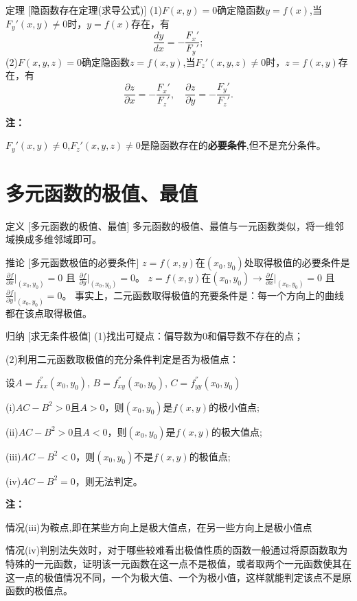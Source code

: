 \documentclass[a4paper,12pt,oneside,fontset=none]{ctexbook}
\newcounter{theorem}[chapter]
\newenvironment{theorem}[1][]{\begin{thmBox}{定理}{#1}}{\end{thmBox}}
\newenvironment{corollary}[1][]{\begin{thmBox}{推论}{#1}}{\end{thmBox}}
\newenvironment{induction}[1][]{\begin{thmBox}{归纳}{#1}}{\end{thmBox}}
\newcounter{definition}[chapter]
\newenvironment{definition}[1][]{\begin{defBox}{定义}{#1}}{\end{defBox}}
\newenvironment{note}{
    \par\vspace{0.5em}\noindent
    \textbf{\color{NoteColor} 注：}
}{
    \par\vspace{0.5em}
}
\numberwithin{equation}{chapter}
\begin{document}
\begin{theorem}
    [隐函数存在定理(求导公式)]
    (1)$F(x,y)=0$确定隐函数$y=f(x)$,当$F_y'(x,y)\neq 0$时，$y=f(x)$存在，有$$\frac{dy}{dx} = -\frac{F_x'}{F_y'};$$
    (2)$F(x,y,z)=0$确定隐函数$z=f(x,y)$,当$F_z'(x,y,z)\neq 0$时，$z=f(x,y)$存在，有$$\frac{\partial z}{\partial x} = -\frac{F_x'}{F_z'}, \quad \frac{\partial z}{\partial y} = -\frac{F_y'}{F_z'}.$$
\end{theorem}
\begin{note}
    $F_y'(x,y)\neq 0$,$F_z'(x,y,z)\neq 0$是隐函数存在的\textbf{必要条件},但不是充分条件。
\end{note}



\section{多元函数的极值、最值}
\begin{definition}
    [多元函数的极值、最值]
    多元函数的极值、最值与一元函数类似，将一维邻域换成多维邻域即可。
\end{definition}

\begin{corollary}
    [多元函数极值的必要条件]
    $z=f(x,y)$在$(x_0,y_0)$处取得极值的必要条件是 $\frac{\partial f}{\partial x}|_{(x_0,y_0)} = 0$ 且 $\frac{\partial f}{\partial y}|_{(x_0,y_0)} = 0$。
    $z=f(x,y)$在$(x_0,y_0) \rightarrow \frac{\partial f}{\partial x}|_{(x_0,y_0)} = 0$ 且 $\frac{\partial f}{\partial y}|_{(x_0,y_0)} = 0$。
    事实上，二元函数取得极值的充要条件是：每一个方向上的曲线都在该点取得极值。
\end{corollary}

\begin{induction}
    [求无条件极值]
    (1)找出可疑点：偏导数为0和偏导数不存在的点；
    
    (2)利用二元函数取极值的充分条件判定是否为极值点：

    设$A = f_{xx}^{''}(x_0,y_0)$, $B = f_{xy}^{''}(x_0,y_0)$, $C = f_{yy}^{''}(x_0,y_0)$

    (i)$AC - B^2 > 0$且$A > 0$，则$(x_0,y_0)$是$f(x,y)$的极小值点;

    (ii)$AC - B^2 > 0$且$A < 0$，则$(x_0,y_0)$是$f(x,y)$的极大值点;

    (iii)$AC - B^2 < 0$，则$(x_0,y_0)$不是$f(x,y)$的极值点;

    (iv)$AC - B^2 = 0$，则无法判定。
\end{induction}
\begin{note}
    情况(iii)为鞍点,即在某些方向上是极大值点，在另一些方向上是极小值点

    情况(iv)判别法失效时，对于哪些较难看出极值性质的函数一般通过将原函数取为特殊的一元函数，证明该一元函数在这一点不是极值，或者取两个一元函数使其在这一点的极值情况不同，一个为极大值、一个为极小值，这样就能判定该点不是原函数的极值点。
\end{note}
\end{document}
